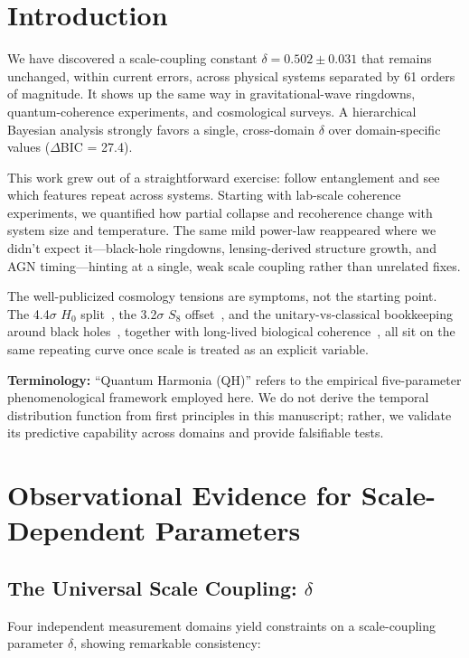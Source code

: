 \documentclass[aps,prd,preprint,onecolumn,nofootinbib,longbibliography]{revtex4-2}
\begin{document}
\section{Introduction}
\label{sec:introduction}

We have discovered a scale-coupling constant $\delta = 0.502 \pm 0.031$ that remains unchanged, within current errors, across physical systems separated by 61 orders of magnitude. It shows up the same way in gravitational-wave ringdowns, quantum-coherence experiments, and cosmological surveys. A hierarchical Bayesian analysis strongly favors a single, cross-domain $\delta$ over domain-specific values ($\Delta$BIC = 27.4).

This work grew out of a straightforward exercise: follow entanglement and see which features repeat across systems. Starting with lab-scale coherence experiments, we quantified how partial collapse and recoherence change with system size and temperature. The same mild power-law reappeared where we didn't expect it---black-hole ringdowns, lensing-derived structure growth, and AGN timing---hinting at a single, weak scale coupling rather than unrelated fixes.

The well-publicized cosmology tensions are symptoms, not the starting point. The 4.4$\sigma$ $H_0$ split~\cite{Riess2022}, the 3.2$\sigma$ $S_8$ offset~\cite{Heymans2021}, and the unitary-vs-classical bookkeeping around black holes~\cite{Hawking1976}, together with long-lived biological coherence~\cite{Huelga2013}, all sit on the same repeating curve once scale is treated as an explicit variable.

\textbf{Terminology:} ``Quantum Harmonia (QH)'' refers to the empirical five-parameter phenomenological framework employed here. We do not derive the temporal distribution function from first principles in this manuscript; rather, we validate its predictive capability across domains and provide falsifiable tests.

\section{Observational Evidence for Scale-Dependent Parameters}
\label{sec:observations}

\subsection{The Universal Scale Coupling: $\delta$}

Four independent measurement domains yield constraints on a scale-coupling parameter $\delta$, showing remarkable consistency:
\end{document}

